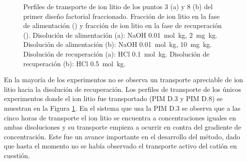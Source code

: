 \begin{figure}[H]
    \centering
    \caption[Perfiles de transporte de ion litio membranas primer diseño factorial fraccionado.]{Perfiles de transporte de ion litio de los puntos 3 (a) y 8 (b) del primer diseño factorial fraccionado. Fracción de ion litio en la fase de alimentación (\protect\squareblck) y fracción de ion litio en la fase de recuperación (\protect\squarewht). Disolución de alimentación (a): NaOH 0.01~mol~kg\mnn,  2~mg~kg\mnn. Disolución de alimentación (b): NaOH 0.01~mol~kg\mnn,  10~mg~kg\mnn. Disolución de recuperación (a): HCl 0.1~mol~kg\mnn. Disolución de recuperación (b): HCl 0.5~mol~kg\mnn.}        
    \label{fig:FrF2_1.profiles}
\end{figure}

En la mayoría de los experimentos no se observa un transporte apreciable de ion litio hacia la diso\-lución de recuperación. Los perfiles de transporte de los únicos experimentos donde el ion litio fue transportado (PIM D.3 y PIM D.8) se muestran en la Figura \ref{fig:FrF2_1.profiles}. En el sistema que usa la PIM D.3 se observa que a las cinco horas de transporte el ion litio se encuentra a concentraciones iguales en ambas disoluciones y su transporte empieza a ocurrir en contra del gradiente de concentración. Este fue un avance importante en el desarrollo del método, dado que hasta el momento no se había observado el transporte activo del catión en cuestión.

